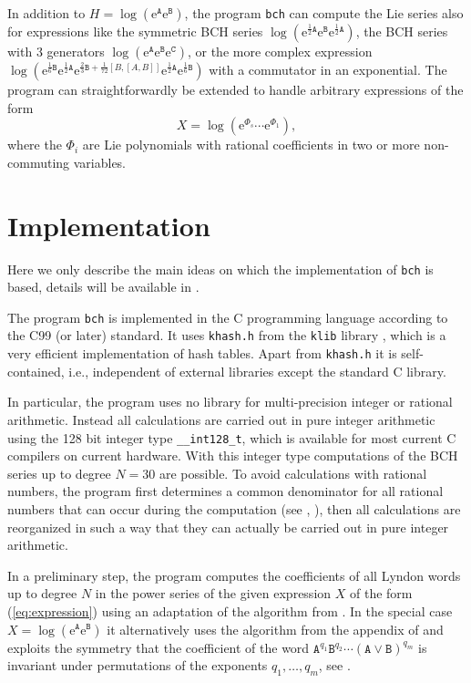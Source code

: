 \documentclass[11pt,a4paper]{article}
\newcommand{\ee}{\mathrm{e}}
\renewcommand{\AA}{\mathtt{A}}
\newcommand{\BB}{\mathtt{B}}
\newcommand{\CC}{\mathtt{C}}
\begin{document}
In addition to $H=\log(\ee^\AA\ee^\BB)$, the program  \verb|bch| can  compute  the Lie series  also for expressions
like the symmetric BCH series
$\log(\ee^{\frac{1}{2}\AA}\ee^\BB\ee^{\frac{1}{2}\AA})$,
the BCH series with 3 generators
$\log(\ee^\AA\ee^\BB\ee^\CC)$,
or the more complex expression 
$\log(\ee^{\frac{1}{6}\BB}\ee^{\frac{1}{2}\AA}
\ee^{\frac{2}{3}\BB+\frac{1}{72}[B,[A,B]]}\ee^{\frac{1}{2}\AA}\ee^{\frac{1}{6}\BB})$
with a commutator in an exponential.
The program can straightforwardly be extended to handle arbitrary expressions of
the form
\begin{equation}\label{eq:expression}
X = \log(\ee^{\Phi_s}\cdots\ee^{\Phi_1}),
\end{equation}
 where the $\Phi_i$ are Lie polynomials
with rational coefficients in two or more non-commuting variables.




\section{Implementation}\label{Sec:Imnplementation}
Here we only describe the main ideas on which the implementation of \verb|bch| is based, details will be available in \cite{HHfast}.

The program \verb|bch| is implemented in the  C programming language according to the
C99 (or later) standard. It uses  \verb|khash.h| from the \verb|klib| library \cite{klib}, which is a very efficient implementation of hash tables.
Apart from \verb|khash.h| it is self-contained, i.e., independent of external libraries except the standard C library. 

In particular, the program  uses no library for multi-precision integer or rational arithmetic.
Instead all calculations are carried out in  pure integer arithmetic using the 
128 bit integer type \verb|__int128_t|, which is available for most current C compilers on 
current hardware. With  this integer type computations of the BCH series up to degree
$N=30$ are possible.
To avoid calculations with rational numbers,
the program first determines a common denominator for all rational numbers that can 
occur during the computation (see \cite{HHdenom}, \cite{HHSmallestDenom}), 
then all calculations are reorganized in such a way
that they can actually be carried out in pure integer arithmetic.


In a  preliminary step,
the program  computes the coefficients of all Lyndon words up to degree 
$N$ 
 in the power series of the given expression $X$ of the form (\ref{eq:expression})
using an adaptation of the algorithm from \cite{HHetalWordAlg}. In the special
case $X=\log(\ee^\AA\ee^\BB)$ it alternatively uses the algorithm from 
the appendix of \cite{HHSmallestDenom} and exploits the symmetry that
the coefficient of the word $\AA^{q_1}\BB^{q_2}\cdots(\AA\lor\BB)^{q_m}$ is
invariant under permutations of the exponents $q_1,\dots,q_m$, see \cite{G}.
\end{document}
